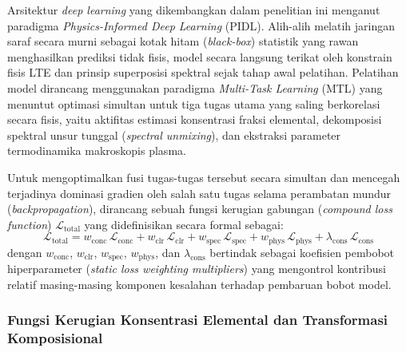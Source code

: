 Arsitektur \textit{deep learning} yang dikembangkan dalam penelitian ini menganut paradigma \textit{Physics-Informed Deep Learning} (PIDL). Alih-alih melatih jaringan saraf secara murni sebagai kotak hitam (\textit{black-box}) statistik yang rawan menghasilkan prediksi tidak fisis, model secara langsung terikat oleh konstrain fisis LTE dan prinsip superposisi spektral sejak tahap awal pelatihan. Pelatihan model dirancang menggunakan paradigma \textit{Multi-Task Learning} (MTL) yang menuntut optimasi simultan untuk tiga tugas utama yang saling berkorelasi secara fisis, yaitu aktifitas estimasi konsentrasi fraksi elemental, dekomposisi spektral unsur tunggal (\textit{spectral unmixing}), dan ekstraksi parameter termodinamika makroskopis plasma.

Untuk mengoptimalkan fusi tugas-tugas tersebut secara simultan dan mencegah terjadinya dominasi gradien oleh salah satu tugas selama perambatan mundur (\textit{backpropagation}), dirancang sebuah fungsi kerugian gabungan (\textit{compound loss function}) $\mathcal{L}_{\mathrm{total}}$ yang didefinisikan secara formal sebagai:
\begin{equation} \label{eq:bab2_loss_total}
\mathcal{L}_{\mathrm{total}} = w_{\mathrm{conc}}\,\mathcal{L}_{\mathrm{conc}} + w_{\mathrm{clr}}\,\mathcal{L}_{\mathrm{clr}} + w_{\mathrm{spec}}\,\mathcal{L}_{\mathrm{spec}} + w_{\mathrm{phys}}\,\mathcal{L}_{\mathrm{phys}} + \lambda_{\mathrm{cons}}\,\mathcal{L}_{\mathrm{cons}}
\end{equation}
dengan $w_{\mathrm{conc}}$, $w_{\mathrm{clr}}$, $w_{\mathrm{spec}}$, $w_{\mathrm{phys}}$, dan $\lambda_{\mathrm{cons}}$ bertindak sebagai koefisien pembobot hiperparameter (\textit{static loss weighting multipliers}) yang mengontrol kontribusi relatif masing-masing komponen kesalahan terhadap pembaruan bobot model.

\subsubsection{Fungsi Kerugian Konsentrasi Elemental dan Transformasi Komposisional}

